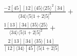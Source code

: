 \documentclass[varwidth, border=5pt]{standalone}
\begin{document}
\begin{my}
$\begin{gathered}
\scriptscriptstyle\frac{-2[45][12]⟨45⟩⟨25⟩^2[34]}{⟨34⟩⟨5|1+2|5]^3}+\\
\scriptscriptstyle\frac{1[13][34]⟨35⟩⟨25⟩}{⟨34⟩⟨5|1+2|5]^2}+\\
\scriptscriptstyle\frac{2[13][34]⟨35⟩[14]}{[12]⟨34⟩[45]⟨5|1+2|5]}\phantom{+}
\end{gathered}$
\end{my}
\end{document}
